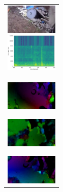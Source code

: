 \begin{figure}[H]
\begin{tabular}{l}
\begin{minipage}{0.165\hsize}
\begin{center}
          \includegraphics[clip, width=2.5cm]{./Figures/still_commandmatemate5.eps}
        \end{center}
      \end{minipage}
      \begin{minipage}{0.165\hsize}
        \begin{center}
          \includegraphics[clip, width=2.5cm]{./Figures/sound_commandmatemate.eps}
        \end{center}
      \end{minipage}
\\  %
      \begin{minipage}{0.165\hsize}
        \begin{center}
          \includegraphics[clip, width=2.5cm]{./Figures/optic_commandmatemate1.eps}
          \hspace{0.3cm} { }
        \end{center}
      \end{minipage}
      \begin{minipage}{0.165\hsize}
        \begin{center}
          \includegraphics[clip, width=2.5cm]{./Figures/optic_commandmatemate2.eps}
          \hspace{0.0cm} { }
        \end{center}
      \end{minipage}
      \begin{minipage}{0.165\hsize}
        \begin{center}
          \includegraphics[clip, width=2.5cm]{./Figures/optic_commandmatemate3.eps}

\end{center}
\end{minipage}
\end{tabular}
\end{figure}
